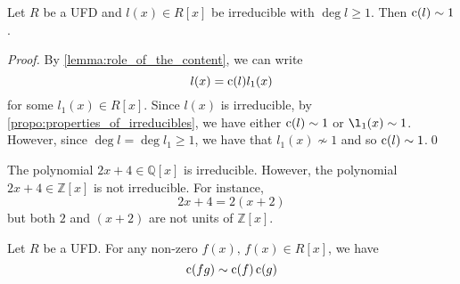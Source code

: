 \begin{lemma}
\label{lemma:non_trivial_irreducible_polynomials_are_primitive}
Let $R$ be a UFD and $l(x) \in R[x]$ be irreducible with $\deg l \geq 1$. Then $\operatorname{c}(l) \sim 1$.
\end{lemma}

\begin{proof}
  By \cref{lemma:role_of_the_content}, we can write
  \begin{equation*}
    l(x) = \operatorname{c}(l) l_1(x)
  \end{equation*}
  for some $l_1(x) \in R[x]$. Since $l(x)$ is irreducible, by \cref{propo:properties_of_irreducibles}, we have either $\operatorname{c}(l) \sim 1$ or $\l_1(x) \sim 1$. However, since $\deg l = \deg l_1 \geq 1$, we have that $l_1(x) \not\sim 1$ and so $\operatorname{c}(l) \sim 1$.\qed
\end{proof}

\begin{eg}
  The polynomial $2x + 4 \in \mathbb{Q}[x]$ is irreducible. However, the polynomial $2x + 4 \in \mathbb{Z}[x]$ is not irreducible. For instance,
  \begin{equation*}
    2x + 4 = 2(x + 2)
  \end{equation*}
  but both $2$ and $(x + 2)$ are not units of $\mathbb{Z}[x]$.
\end{eg}

\begin{thm}
\label{thm:gauss_lemma}
  Let $R$ be a UFD. For any non-zero $f(x), \, f(x) \in R[x]$, we have
  \begin{equation*}
    \operatorname{c}(fg) \sim \operatorname{c}(f) \operatorname{c}(g)
  \end{equation*}
\end{thm}

